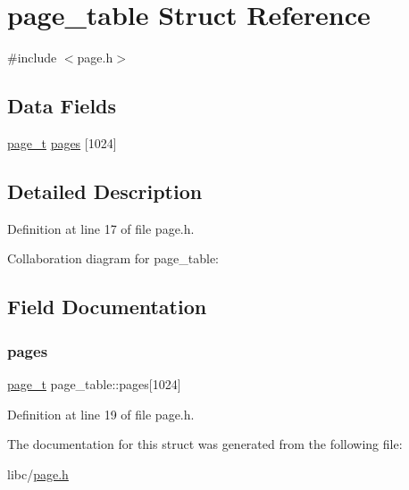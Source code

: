 \hypertarget{a00252}{}\section{page\+\_\+table Struct Reference}
\label{a00252}


{\ttfamily \#include $<$page.\+h$>$}

\subsection*{Data Fields}
\begin{DoxyCompactItemize}
\item 
\hyperlink{a00122_a76113662e059e0926a92c5b15c098f4a_a76113662e059e0926a92c5b15c098f4a}{page\+\_\+t} \hyperlink{a00252_a48867fe3c6d8599eff21b790260d55b4_a48867fe3c6d8599eff21b790260d55b4}{pages} \mbox{[}1024\mbox{]}
\end{DoxyCompactItemize}


\subsection{Detailed Description}


Definition at line 17 of file page.\+h.



Collaboration diagram for page\+\_\+table\+:


\subsection{Field Documentation}
\mbox{\label{a00252_a48867fe3c6d8599eff21b790260d55b4_a48867fe3c6d8599eff21b790260d55b4}} 
\subsubsection{\texorpdfstring{pages}{pages}}
{\footnotesize\ttfamily \hyperlink{a00122_a76113662e059e0926a92c5b15c098f4a_a76113662e059e0926a92c5b15c098f4a}{page\+\_\+t} page\+\_\+table\+::pages\mbox{[}1024\mbox{]}}



Definition at line 19 of file page.\+h.



The documentation for this struct was generated from the following file\+:\begin{DoxyCompactItemize}
\item 
libc/\hyperlink{a00122}{page.\+h}\end{DoxyCompactItemize}
